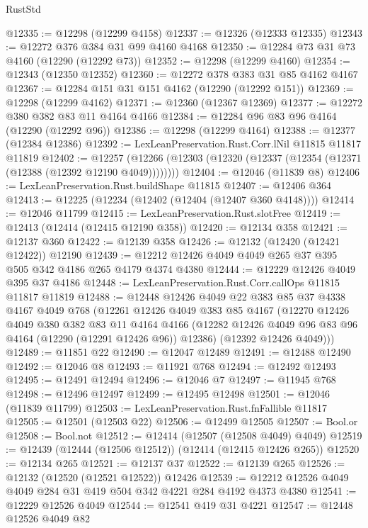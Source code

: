 \begin{lexlean}{RustStd}
\begin{coremodule}
@12335 := @12298 (@12299 @4158)
@12337 := @12326 (@12333 @12335)
@12343 := @12272 @376 @384 @31 @99 @4160 @4168
@12350 := @12284 @73 @31 @73 @4160 (@12290 (@12292 @73))
@12352 := @12298 (@12299 @4160)
@12354 := @12343 (@12350 @12352)
@12360 := @12272 @378 @383 @31 @85 @4162 @4167
@12367 := @12284 @151 @31 @151 @4162 (@12290 (@12292 @151))
@12369 := @12298 (@12299 @4162)
@12371 := @12360 (@12367 @12369)
@12377 := @12272 @380 @382 @83 @11 @4164 @4166
@12384 := @12284 @96 @83 @96 @4164 (@12290 (@12292 @96))
@12386 := @12298 (@12299 @4164)
@12388 := @12377 (@12384 @12386)
@12392 := LexLeanPreservation.Rust.Corr.lNil @11815 @11817 @11819
@12402 := @12257
    (@12266 (@12303 (@12320 (@12337 (@12354 (@12371 (@12388 (@12392 @12190 @4049))))))))
@12404 := @12046 (@11839 @8)
@12406 := LexLeanPreservation.Rust.buildShape @11815
@12407 := @12406 @364
@12413 := @12225 (@12234 (@12402 (@12404 (@12407 @360 @4148))))
@12414 := @12046 @11799
@12415 := LexLeanPreservation.Rust.slotFree
@12419 := @12413 (@12414 (@12415 @12190 @358))
@12420 := @12134 @358
@12421 := @12137 @360
@12422 := @12139 @358
@12426 := @12132 (@12420 (@12421 @12422)) @12190
@12439 := @12212 @12426 @4049 @4049 @265 @37 @395 @505 @342 @4186 @265 @4179 @4374 @4380
@12444 := @12229 @12426 @4049 @395 @37 @4186
@12448 := LexLeanPreservation.Rust.Corr.callOps @11815 @11817 @11819
@12488 := @12448
    @12426
    @4049
    @22
    @383
    @85
    @37
    @4338
    @4167
    @4049
    @768
    (@12261
      @12426
      @4049
      @383
      @85
      @4167
      (@12270
        @12426
        @4049
        @380
        @382
        @83
        @11
        @4164
        @4166
        (@12282 @12426 @4049 @96 @83 @96 @4164 (@12290 (@12291 @12426 @96)) @12386)
        (@12392 @12426 @4049)))
@12489 := @11851 @22
@12490 := @12047 @12489
@12491 := @12488 @12490
@12492 := @12046 @8
@12493 := @11921 @768
@12494 := @12492 @12493
@12495 := @12491 @12494
@12496 := @12046 @7
@12497 := @11945 @768
@12498 := @12496 @12497
@12499 := @12495 @12498
@12501 := @12046 (@11839 @11799)
@12503 := LexLeanPreservation.Rust.fnFallible @11817
@12505 := @12501 (@12503 @22)
@12506 := @12499 @12505
@12507 := Bool.or
@12508 := Bool.not
@12512 := @12414 (@12507 (@12508 @4049) @4049)
@12519 := @12439 (@12444 (@12506 @12512)) (@12414 (@12415 @12426 @265))
@12520 := @12134 @265
@12521 := @12137 @37
@12522 := @12139 @265
@12526 := @12132 (@12520 (@12521 @12522)) @12426
@12539 := @12212 @12526 @4049 @4049 @284 @31 @419 @504 @342 @4221 @284 @4192 @4373 @4380
@12541 := @12229 @12526 @4049
@12544 := @12541 @419 @31 @4221
@12547 := @12448 @12526 @4049 @82

\end{coremodule}
\end{lexlean}
